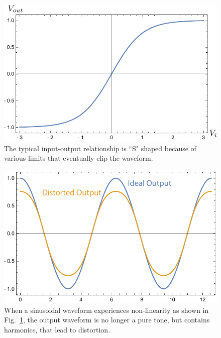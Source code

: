 \begin{figure}[tb]
\begin{center}
\includegraphics[width=.75\columnwidth]{vtanh}
\end{center}
\caption{The typical input-output relationship is ``S" shaped because of various limits that eventually clip the waveform.} \label{fig:vtanh}
\end{figure}

\begin{figure}[tb]
\begin{center}
\includegraphics[width=.75\columnwidth]{vdisto}
\end{center}
\caption{When a sinusoidal waveform experiences non-linearity as shown in Fig.~\ref{fig:vtanh}, the output waveform is no longer a pure tone, but contains harmonics, that lead to distortion.} \label{fig:vdisto}
\end{figure}


